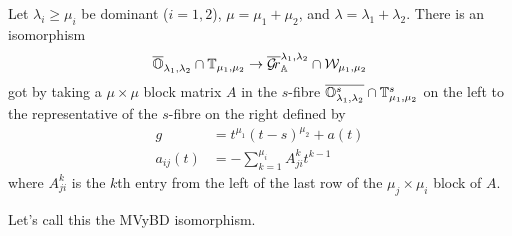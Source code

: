 \documentclass[draft]{article}
\begin{document}
\begin{theorem}
    Let $\lambda_i\ge\mu_i$ be dominant ($i=1,2$), $\mu = \mu_1 +\mu_2$, and $\lambda =\lambda_1+\lambda_2$. 
    There is an isomorphism 
    \begin{equation}
        \overline{\mathbb O}_{\lambda_1,\lambda_2}\cap\mathbb T_{\mu_1,\mu_2} \to \overline{\mathcal{G}\!r}_\mathbb A^{\lambda_1,\lambda_2}\cap \mathcal W_{\mu_1,\mu_2}
    \end{equation}
    got by taking a $\mu\times\mu$ block matrix $A$ in the $s$-fibre $\overline{\mathbb O_{\lambda_1,\lambda_2}^s}\cap\mathbb T_{\mu_1,\mu_2}^s$ on the left to the representative of the $s$-fibre on the right defined by  
    \begin{equation}
        \begin{split}
            g &= t^{\mu_1} (t-s)^{\mu_2} + a(t) \\
            a_{ij}(t) &= - \sum_{k=1}^{\mu_i} A^k_{ji} t^{k-1}
        \end{split}
    \end{equation}
    where $A^k_{ji}$ is the $k$th entry from the left of the last row of the $\mu_j\times\mu_i$ block of $A$. 
\end{theorem}

Let's call this the MVyBD isomorphism.
\end{document}
